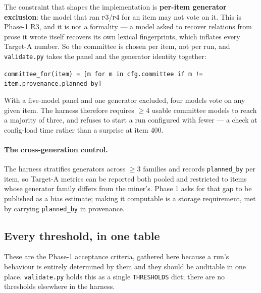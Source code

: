 \documentclass[11pt]{article}
\newcommand{\pymod}[1]{\texttt{#1}}
\begin{document}
The constraint that shapes the implementation is \textbf{per-item generator exclusion}: the model
that ran \textsc{p3}/\textsc{p4} for an item may not vote on it. This is Phase-1 R3, and it is not
a formality --- a model asked to recover relations from prose it wrote itself recovers its own
lexical fingerprints, which inflates every Target-A number. So the committee is chosen per item,
not per run, and \pymod{validate.py} takes the panel and the generator identity together:

\begin{center}\small
\texttt{committee\_for(item) = [m for m in cfg.committee if m != item.provenance.planned\_by]}
\end{center}

With a five-model panel and one generator excluded, four models vote on any given item. The
harness therefore requires $\geq$4 usable committee models to reach a majority of three, and
refuses to start a run configured with fewer --- a check at config-load time rather than a
surprise at item 400.

\paragraph{The cross-generation control.} The harness stratifies generators across $\geq$3
families and records \texttt{planned\_by} per item, so Target-A metrics can be reported both
pooled and restricted to items whose generator family differs from the miner's. Phase 1 asks for
that gap to be published as a bias estimate; making it computable is a storage requirement, met by
carrying \texttt{planned\_by} in provenance.

\subsection{Every threshold, in one table}

These are the Phase-1 acceptance criteria, gathered here because a run's behaviour is entirely
determined by them and they should be auditable in one place. \pymod{validate.py} holds this as a
single \texttt{THRESHOLDS} dict; there are no thresholds elsewhere in the harness.
\end{document}
